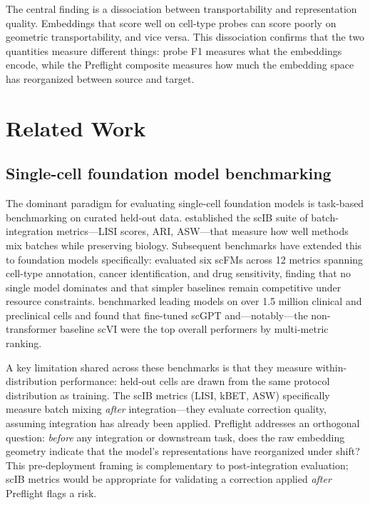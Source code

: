 \documentclass[11pt,letterpaper]{article}
\begin{document}
The central finding is a dissociation between transportability and representation quality. Embeddings that score well on cell-type probes can score poorly on geometric transportability, and vice versa. This dissociation confirms that the two quantities measure different things: probe F1 measures what the embeddings encode, while the Preflight composite measures how much the embedding space has reorganized between source and target.


\section{Related Work}
\label{sec:related}

\subsection{Single-cell foundation model benchmarking}

The dominant paradigm for evaluating single-cell foundation models is task-based benchmarking on curated held-out data. \citet{luecken2022scib} established the scIB suite of batch-integration metrics---LISI scores, ARI, ASW---that measure how well methods mix batches while preserving biology. Subsequent benchmarks have extended this to foundation models specifically: \citet{wu2025scfm} evaluated six scFMs across 12 metrics spanning cell-type annotation, cancer identification, and drug sensitivity, finding that no single model dominates and that simpler baselines remain competitive under resource constraints. \citet{nguyen2026scfm} benchmarked leading models on over 1.5 million clinical and preclinical cells and found that fine-tuned scGPT and---notably---the non-transformer baseline scVI were the top overall performers by multi-metric ranking.

A key limitation shared across these benchmarks is that they measure within-distribution performance: held-out cells are drawn from the same protocol distribution as training. The scIB metrics (LISI, kBET, ASW) specifically measure batch mixing \emph{after} integration---they evaluate correction quality, assuming integration has already been applied. Preflight addresses an orthogonal question: \emph{before} any integration or downstream task, does the raw embedding geometry indicate that the model's representations have reorganized under shift? This pre-deployment framing is complementary to post-integration evaluation; scIB metrics would be appropriate for validating a correction applied \emph{after} Preflight flags a risk.
\end{document}
